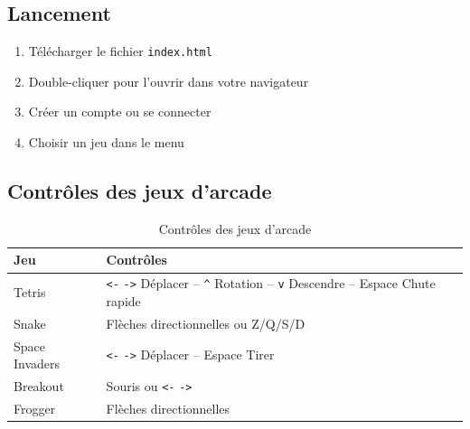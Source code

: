 \documentclass[a4paper, 12pt, twoside]{article}
\begin{document}
\subsection{Lancement}

\begin{enumerate}
  \item Télécharger le fichier \texttt{index.html}
  \item Double-cliquer pour l'ouvrir dans votre navigateur
  \item Créer un compte ou se connecter
  \item Choisir un jeu dans le menu
\end{enumerate}

\subsection{Contrôles des jeux d'arcade}

\begin{table}[H]
\centering
\begin{tabular}{|l|l|}
\hline
\textbf{Jeu} & \textbf{Contrôles} \\
\hline
Tetris & \texttt{<-} \texttt{->} Déplacer -- \texttt{\^{}} Rotation -- \texttt{v} Descendre -- Espace Chute rapide \\
\hline
Snake & Flèches directionnelles ou Z/Q/S/D \\
\hline
Space Invaders & \texttt{<-} \texttt{->} Déplacer -- Espace Tirer \\
\hline
Breakout & Souris ou \texttt{<-} \texttt{->} \\
\hline
Frogger & Flèches directionnelles \\
\hline
\end{tabular}
\caption{Contrôles des jeux d'arcade}
\label{tab:controles}
\end{table}
\end{document}
